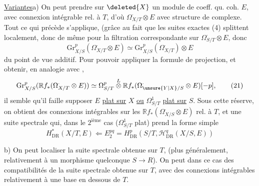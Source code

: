 \uline{Variantes}\qquad a) On peut prendre sur $\deleted{X}$ un module de coeff. qu. coh. $E$, avec connexion intégrable rel. à $T$, d'où $\Omega^\cdot_{X/T}\otimes E$ avec structure de complexe. Tout ce qui précède s'applique, (grâce au fait que les suites exactes (4) splittent localement, donc  de même pour la filtration correspondante sur $\Omega^\cdot_{S/T}\otimes E$, donc
\[
 \mathrm{Gr}_{X/S}^{p}(\Omega^\cdot_{X/T}\otimes E)
 \simeq\mathrm{Gr}_{X/S}^{p}(\Omega^\cdot_{X/T})\otimes E
\]
du point de vue additif. Pour pouvoir appliquer la formule de projection, et obtenir, en analogie avec  ,
\[
 \mathrm{Gr}_{X/S}^{p}(\mathbb R f_*(\Omega^\cdot_{X/T}\otimes E))
 \simeq\Omega^p_{S/T}\overset{L}{\otimes}\mathbb R f_*(\Omega^\cdot_{\unsure{Y|X}/S}\otimes E)[-p],
 \tag*{(21)}
\]
il semble qu'il faille supposer $E$ \uline{plat sur} $X$ \uline{ou} $\Omega^1_{S/T}$ \uline{plat sur} $S$. Sous cette réserve, on obtient des  connexions intégrables sur les $\mathbb R f_*(\Omega^\cdot_{X/S}\otimes E)$ rel. à $T$, et une suite spectrale qui, dans le $2^{\text{ième}}$ cas ($\Omega^1_{S/T}$ plat) prend la forme simple
\[
 H^*_{\mathrm{DR}}(X/T,E)\Longleftarrow E_2^{pq}=H^p_{\mathrm{DR}}(S/T,\mathscr H^q_{\mathrm{DR}}(X/S,E))
 \tag*{(22)}
\]

b) On peut localiser la suite spectrale obtenue sur $T$, (plus généralement, relativement à un morphisme quelconque $S\longrightarrow R$). On peut dans ce cas  des compatibilités de la suite spectrale obtenue sur $T$, avec des connexions intégrables relativement à une base en dessous de $T$.

